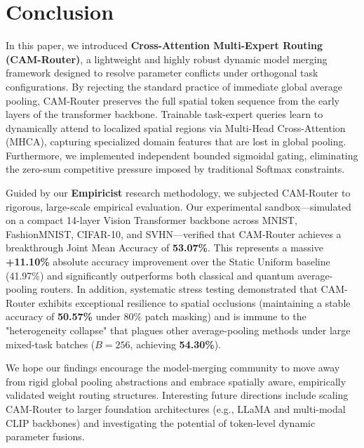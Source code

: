 \section{Conclusion}
\label{sec:conclusion}

In this paper, we introduced \textbf{Cross-Attention Multi-Expert Routing (CAM-Router)}, a lightweight and highly robust dynamic model merging framework designed to resolve parameter conflicts under orthogonal task configurations. By rejecting the standard practice of immediate global average pooling, CAM-Router preserves the full spatial token sequence from the early layers of the transformer backbone. Trainable task-expert queries learn to dynamically attend to localized spatial regions via Multi-Head Cross-Attention (MHCA), capturing specialized domain features that are lost in global pooling. Furthermore, we implemented independent bounded sigmoidal gating, eliminating the zero-sum competitive pressure imposed by traditional Softmax constraints.

Guided by our \textbf{Empiricist} research methodology, we subjected CAM-Router to rigorous, large-scale empirical evaluation. Our experimental sandbox—simulated on a compact 14-layer Vision Transformer backbone across MNIST, FashionMNIST, CIFAR-10, and SVHN—verified that CAM-Router achieves a breakthrough Joint Mean Accuracy of \textbf{53.07\%}. This represents a massive \textbf{+11.10\%} absolute accuracy improvement over the Static Uniform baseline (41.97\%) and significantly outperforms both classical and quantum average-pooling routers. In addition, systematic stress testing demonstrated that CAM-Router exhibits exceptional resilience to spatial occlusions (maintaining a stable accuracy of \textbf{50.57\%} under 80\% patch masking) and is immune to the "heterogeneity collapse" that plagues other average-pooling methods under large mixed-task batches ($B=256$, achieving \textbf{54.30\%}).

We hope our findings encourage the model-merging community to move away from rigid global pooling abstractions and embrace spatially aware, empirically validated weight routing structures. Interesting future directions include scaling CAM-Router to larger foundation architectures (e.g., LLaMA and multi-modal CLIP backbones) and investigating the potential of token-level dynamic parameter fusions.
